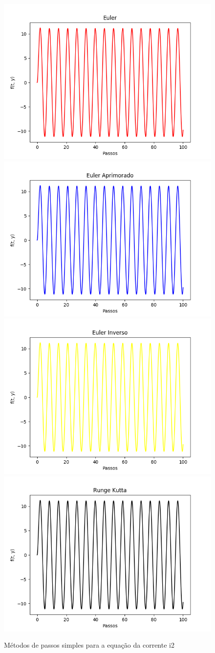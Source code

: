 \documentclass[12pt]{article}%
\begin{document}
    \begin{figure}[H]
        \begin{center}
            \includegraphics[width=.4\textwidth]{problemas/metodos_q3/circuito2_euler.png}
            \includegraphics[width=.4\textwidth]{problemas/metodos_q3/circuito2_euler_aprimorado.png}
            \includegraphics[width=.4\textwidth]{problemas/metodos_q3/circuito2_euler_inverso.png}
            \includegraphics[width=.4\textwidth]{problemas/metodos_q3/circuito2_runge_kutta.png}
        \end{center}
        \caption{Métodos de passos simples para a equação da corrente i2}
    \end{figure}
    
\end{document}
